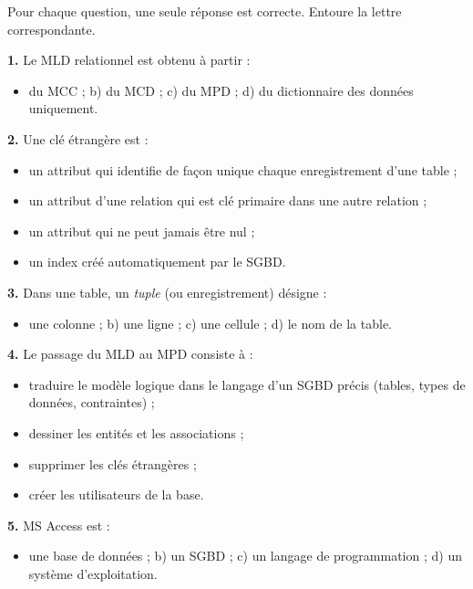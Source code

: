 \documentclass[11pt]{article}
\begin{document}
\begin{exercice}
Pour chaque question, une seule réponse est correcte. Entoure la lettre correspondante.

\textbf{1.} Le MLD relationnel est obtenu à partir :
\begin{itemize}
  \item[a)] du MCC ; \quad b) du MCD ; \quad c) du MPD ; \quad d) du dictionnaire des données uniquement.
\end{itemize}

\textbf{2.} Une clé étrangère est :
\begin{itemize}
  \item[a)] un attribut qui identifie de façon unique chaque enregistrement d'une table ;
  \item[b)] un attribut d'une relation qui est clé primaire dans une autre relation ;
  \item[c)] un attribut qui ne peut jamais être nul ;
  \item[d)] un index créé automatiquement par le SGBD.
\end{itemize}

\textbf{3.} Dans une table, un \emph{tuple} (ou enregistrement) désigne :
\begin{itemize}
  \item[a)] une colonne ; \quad b) une ligne ; \quad c) une cellule ; \quad d) le nom de la table.
\end{itemize}

\textbf{4.} Le passage du MLD au MPD consiste à :
\begin{itemize}
  \item[a)] traduire le modèle logique dans le langage d'un SGBD précis (tables, types de données, contraintes) ;
  \item[b)] dessiner les entités et les associations ;
  \item[c)] supprimer les clés étrangères ;
  \item[d)] créer les utilisateurs de la base.
\end{itemize}

\textbf{5.} MS Access est :
\begin{itemize}
  \item[a)] une base de données ; \quad b) un SGBD ; \quad c) un langage de programmation ; \quad d) un système d'exploitation.
\end{itemize}
\end{exercice}
\end{document}
